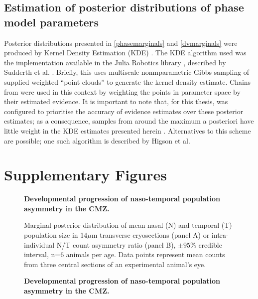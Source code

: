 \subsection{Estimation of posterior distributions of phase model parameters}
\label{ssec:GMCkde}
Posterior distributions presented in \autoref{phasemarginals} and \autoref{dvmarginals} were produced by Kernel Density Estimation (KDE) \cite[p. 122]{Bishop2006}. The KDE algorithm used was the implementation available in the Julia Robotics library , described by Sudderth et al. \cite{Sudderth2010}. Briefly, this uses multiscale nonmparametric Gibbs sampling of supplied weighted ``point clouds'' to generate the kernel density estimate. Chains from  were used in this context by weighting the points in parameter space by their estimated evidence. It is important to note that, for this thesis,  was configured to prioritise the accuracy of evidence estimates over these posterior estimates; as a consequence, samples from around the maximum a posteriori have little weight in the KDE estimates presented herein \cite{Higson2018}. Alternatives to this scheme are possible; one such algorithm is described by Higson et al. \cite{Higson2019}

\section{Supplementary Figures}

\begin{figure}[!h]
    \caption{{\bf Developmental progression of naso-temporal population asymmetry in the CMZ.}}
    \label{morphology}
\end{figure}

\begin{figure}[!h]
    \caption{{\bf Developmental progression of naso-temporal population asymmetry in the CMZ.}}
    Marginal posterior distribution of mean nasal (N) and temporal (T) population size in 14$\mu$m transverse cryosections (panel A) or intra-individual N/T count asymmetry ratio (panel B), $\pm 95\%$ credible interval, n=6 animals per age. Data points represent mean counts from three central sections of an experimental animal's eye. 
    \label{NTontology}
\end{figure}


